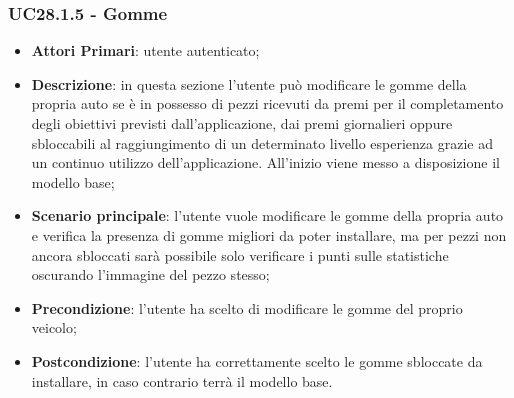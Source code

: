 \subsubsection{UC28.1.5 - Gomme}
\begin{itemize}
	\item \textbf{Attori Primari}: utente autenticato;
	\item \textbf{Descrizione}: in questa sezione l'utente può modificare le gomme della propria auto se è in possesso di pezzi ricevuti da premi per il completamento degli obiettivi previsti dall'applicazione, dai premi giornalieri oppure sbloccabili al raggiungimento di un determinato livello esperienza grazie ad un continuo utilizzo dell'applicazione.
	All'inizio viene messo a disposizione il modello base;
	\item \textbf{Scenario principale}: l'utente vuole modificare le gomme della propria auto e verifica la presenza di gomme migliori da poter installare, ma per pezzi non ancora sbloccati sarà possibile solo verificare i punti sulle statistiche oscurando l'immagine del pezzo stesso;
	\item \textbf{Precondizione}: l'utente ha scelto di modificare le gomme del proprio veicolo; 
	\item \textbf{Postcondizione}: l'utente ha correttamente scelto le gomme sbloccate da installare, in caso contrario terrà il modello base.
\end{itemize}
